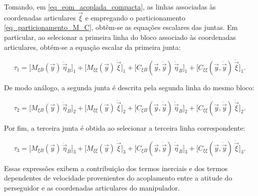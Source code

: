 Tomando, em \eqref{eq_eom_acoplada_compacta}, as linhas associadas às coordenadas articulares $\vec{\xi}$ e empregando o particionamento \eqref{eq_particionamento_M_C}, obtêm-se as equações escalares das juntas.
Em particular, ao selecionar a primeira linha do bloco associado às coordenadas articulares, obtém-se a equação escalar da primeira junta:

\begin{equation}
\tau_1
=
\bigl[M_{\xi B}(\vec y)\,\ddot{\vec\eta}_B\bigr]_1
+
\bigl[M_{\xi\xi}(\vec y)\,\ddot{\vec\xi}\bigr]_1
+
\bigl[C_{\xi B}(\vec y,\dot{\vec y})\,\dot{\vec\eta}_B\bigr]_1
+
\bigl[C_{\xi\xi}(\vec y,\dot{\vec y})\,\dot{\vec\xi}\bigr]_1.
\label{eq_eom_junta1}
\end{equation}

De modo análogo, a segunda junta é descrita pela segunda linha do mesmo bloco:

\begin{equation}
\tau_2
=
\bigl[M_{\xi B}(\vec y)\,\ddot{\vec\eta}_B\bigr]_2
+
\bigl[M_{\xi\xi}(\vec y)\,\ddot{\vec\xi}\bigr]_2
+
\bigl[C_{\xi B}(\vec y,\dot{\vec y})\,\dot{\vec\eta}_B\bigr]_2
+
\bigl[C_{\xi\xi}(\vec y,\dot{\vec y})\,\dot{\vec\xi}\bigr]_2.
\label{eq_eom_junta2}
\end{equation}

Por fim, a terceira junta é obtida ao selecionar a terceira linha correspondente:

\begin{equation}
\tau_3
=
\bigl[M_{\xi B}(\vec y)\,\ddot{\vec\eta}_B\bigr]_3
+
\bigl[M_{\xi\xi}(\vec y)\,\ddot{\vec\xi}\bigr]_3
+
\bigl[C_{\xi B}(\vec y,\dot{\vec y})\,\dot{\vec\eta}_B\bigr]_3
+
\bigl[C_{\xi\xi}(\vec y,\dot{\vec y})\,\dot{\vec\xi}\bigr]_3.
\label{eq_eom_junta3}
\end{equation}

Essas expressões exibem a contribuição dos termos inerciais e dos termos dependentes de velocidade provenientes do acoplamento entre a atitude do perseguidor e as coordenadas articulares do manipulador.


